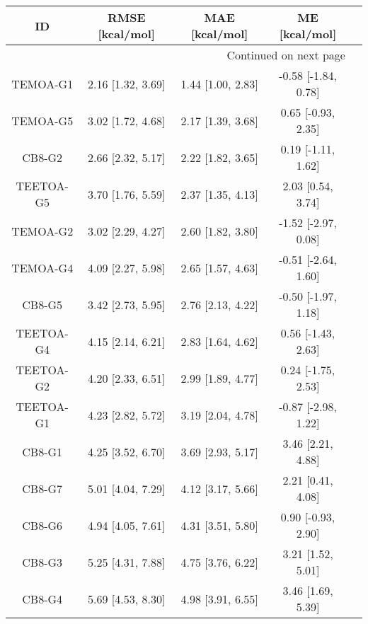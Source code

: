 \documentclass[8pt]{article}
\begin{document}
\begin{center}
\begin{footnotesize}
\begin{longtable}{|ccccc|}
\toprule
        ID &    RMSE [kcal/mol] &     MAE [kcal/mol] &        ME [kcal/mol] \\
\midrule
\endhead
\midrule
\multicolumn{4}{r}{{Continued on next page}} \\
\midrule
\endfoot

\bottomrule
\endlastfoot
  TEMOA-G1 &  2.16 [1.32, 3.69] &  1.44 [1.00, 2.83] &  -0.58 [-1.84, 0.78] \\
  TEMOA-G5 &  3.02 [1.72, 4.68] &  2.17 [1.39, 3.68] &   0.65 [-0.93, 2.35] \\
    CB8-G2 &  2.66 [2.32, 5.17] &  2.22 [1.82, 3.65] &   0.19 [-1.11, 1.62] \\
 TEETOA-G5 &  3.70 [1.76, 5.59] &  2.37 [1.35, 4.13] &    2.03 [0.54, 3.74] \\
  TEMOA-G2 &  3.02 [2.29, 4.27] &  2.60 [1.82, 3.80] &  -1.52 [-2.97, 0.08] \\
  TEMOA-G4 &  4.09 [2.27, 5.98] &  2.65 [1.57, 4.63] &  -0.51 [-2.64, 1.60] \\
    CB8-G5 &  3.42 [2.73, 5.95] &  2.76 [2.13, 4.22] &  -0.50 [-1.97, 1.18] \\
 TEETOA-G4 &  4.15 [2.14, 6.21] &  2.83 [1.64, 4.62] &   0.56 [-1.43, 2.63] \\
 TEETOA-G2 &  4.20 [2.33, 6.51] &  2.99 [1.89, 4.77] &   0.24 [-1.75, 2.53] \\
 TEETOA-G1 &  4.23 [2.82, 5.72] &  3.19 [2.04, 4.78] &  -0.87 [-2.98, 1.22] \\
    CB8-G1 &  4.25 [3.52, 6.70] &  3.69 [2.93, 5.17] &    3.46 [2.21, 4.88] \\
    CB8-G7 &  5.01 [4.04, 7.29] &  4.12 [3.17, 5.66] &    2.21 [0.41, 4.08] \\
    CB8-G6 &  4.94 [4.05, 7.61] &  4.31 [3.51, 5.80] &   0.90 [-0.93, 2.90] \\
    CB8-G3 &  5.25 [4.31, 7.88] &  4.75 [3.76, 6.22] &    3.21 [1.52, 5.01] \\
    CB8-G4 &  5.69 [4.53, 8.30] &  4.98 [3.91, 6.55] &    3.46 [1.69, 5.39] \\
\end{longtable}
\end{footnotesize}
\end{center}
\end{document}
